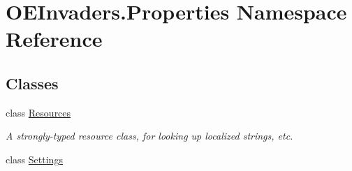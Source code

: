 \hypertarget{namespace_o_e_invaders_1_1_properties}{}\section{O\+E\+Invaders.\+Properties Namespace Reference}
\label{namespace_o_e_invaders_1_1_properties}
\subsection*{Classes}
\begin{DoxyCompactItemize}
\item 
class \mbox{\hyperlink{class_o_e_invaders_1_1_properties_1_1_resources}{Resources}}
\begin{DoxyCompactList}\small\item\em A strongly-\/typed resource class, for looking up localized strings, etc. \end{DoxyCompactList}\item 
class \mbox{\hyperlink{class_o_e_invaders_1_1_properties_1_1_settings}{Settings}}
\end{DoxyCompactItemize}
